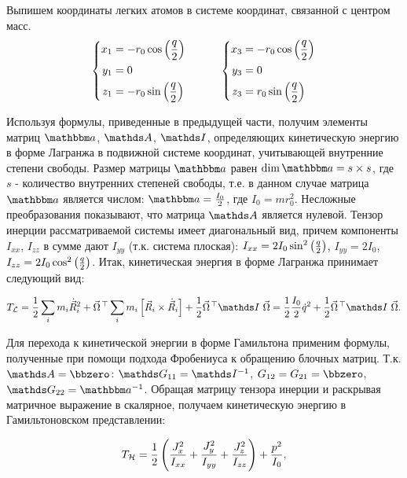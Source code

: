 Выпишем координаты легких атомов в системе координат, связанной с центром масс.
\begin{gather}
\left\{
\begin{aligned}
x_1 &= - r_0 \cos \left( \frac{q}{2} \right) \\
y_1 &= 0 \\
z_1 &= - r_0 \sin \left( \frac{q}{2} \right) 
\end{aligned}
\right. \quad \quad \quad
\left\{
\begin{aligned}
x_3 &= - r_0 \cos \left( \frac{q}{2} \right) \\
y_3 &= 0 \\
z_3 &= r_0 \sin \left( \frac{q}{2} \right)
\end{aligned}
\right.\notag
\end{gather}

Используя формулы, приведенные в предыдущей части, получим элементы матриц $\bba$, $\bbA$, $\bbI$, определяющих кинетическую энергию в форме Лагранжа в подвижной системе координат, учитывающей внутренние степени свободы. Размер матрицы $\bba$ равен $\dim \bba = s \times s$, где $s$ - количество внутренних степеней свободы, т.е. в данном случае матрица $\bba$ является числом: $\bba = \frac{I_0}{2}$, где $I_0 = m r_0^2$. Несложные преобразования показывают, что матрица $\bbA$ является нулевой. Тензор инерции рассматриваемой системы имеет диагональный вид, причем компоненты $I_{xx}$, $I_{zz}$ в сумме дают $I_{yy}$ (т.к. система плоская): $I_{xx} = 2 I_0 \sin^2 \left( \frac{q}{2} \right)$, $I_{yy} = 2I_0$, $I_{zz} = 2I_0 \cos^2 \left( \frac{q}{2} \right)$. Итак, кинетическая энергия 
в форме Лагранжа принимает следующий вид:

\begin{gather}
T_\mathcal{L} = \frac{1}{2} \sum_i m_i \dot{\vec{R}}_i^2 + \vec{\Omega}^{\, \top} \sum_i m_i \left[ \vec{R}_i \times \dot{\vec{R}}_i \right] + \frac{1}{2} \vec{\Omega}^{\, \top} \bbI \ \vec{\Omega} = \frac{1}{2} \frac{I_0}{2} \dot{q}^2 + \frac{1}{2} \vec{\Omega}^{\, \top} \bbI \ \vec{\Omega}. \notag
\end{gather} 

Для перехода к кинетической энергии в форме Гамильтона применим формулы, полученные при помощи подхода Фробениуса к обращению блочных матриц. Т.к. $\bbA = \bbzero$: $\bbG_{11} = \bbI^{-1}$, $G_{12} = G_{21} = \bbzero$, $\bbG_{22} = \bba^{-1}$. Обращая матрицу тензора инерции и раскрывая матричное выражение в скалярное, получаем кинетическую энергию в Гамильтоновском представлении:

\begin{gather}
T_\mathcal{H} = \frac{1}{2} \left( \frac{J_x^2}{I_{xx}} + \frac{J_y^2}{I_{yy}} + \frac{J_z^2}{I_{zz}} \right) + \frac{p^2}{I_0}, \notag
\end{gather}

